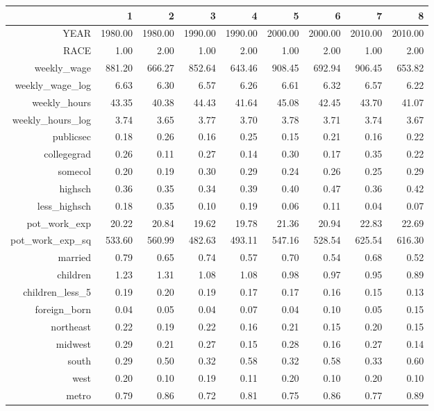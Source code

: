\begin{table}[ht]
\centering
\begin{tabular}{rrrrrrrrr}
  \hline
 & 1 & 2 & 3 & 4 & 5 & 6 & 7 & 8 \\ 
  \hline
YEAR & 1980.00 & 1980.00 & 1990.00 & 1990.00 & 2000.00 & 2000.00 & 2010.00 & 2010.00 \\ 
  RACE & 1.00 & 2.00 & 1.00 & 2.00 & 1.00 & 2.00 & 1.00 & 2.00 \\ 
  weekly\_wage & 881.20 & 666.27 & 852.64 & 643.46 & 908.45 & 692.94 & 906.45 & 653.82 \\ 
  weekly\_wage\_log & 6.63 & 6.30 & 6.57 & 6.26 & 6.61 & 6.32 & 6.57 & 6.22 \\ 
  weekly\_hours & 43.35 & 40.38 & 44.43 & 41.64 & 45.08 & 42.45 & 43.70 & 41.07 \\ 
  weekly\_hours\_log & 3.74 & 3.65 & 3.77 & 3.70 & 3.78 & 3.71 & 3.74 & 3.67 \\ 
  publicsec & 0.18 & 0.26 & 0.16 & 0.25 & 0.15 & 0.21 & 0.16 & 0.22 \\ 
  collegegrad & 0.26 & 0.11 & 0.27 & 0.14 & 0.30 & 0.17 & 0.35 & 0.22 \\ 
  somecol & 0.20 & 0.19 & 0.30 & 0.29 & 0.24 & 0.26 & 0.25 & 0.29 \\ 
  highsch & 0.36 & 0.35 & 0.34 & 0.39 & 0.40 & 0.47 & 0.36 & 0.42 \\ 
  less\_highsch & 0.18 & 0.35 & 0.10 & 0.19 & 0.06 & 0.11 & 0.04 & 0.07 \\ 
  pot\_work\_exp & 20.22 & 20.84 & 19.62 & 19.78 & 21.36 & 20.94 & 22.83 & 22.69 \\ 
  pot\_work\_exp\_sq & 533.60 & 560.99 & 482.63 & 493.11 & 547.16 & 528.54 & 625.54 & 616.30 \\ 
  married & 0.79 & 0.65 & 0.74 & 0.57 & 0.70 & 0.54 & 0.68 & 0.52 \\ 
  children & 1.23 & 1.31 & 1.08 & 1.08 & 0.98 & 0.97 & 0.95 & 0.89 \\ 
  children\_less\_5 & 0.19 & 0.20 & 0.19 & 0.17 & 0.17 & 0.16 & 0.15 & 0.13 \\ 
  foreign\_born & 0.04 & 0.05 & 0.04 & 0.07 & 0.04 & 0.10 & 0.05 & 0.15 \\ 
  northeast & 0.22 & 0.19 & 0.22 & 0.16 & 0.21 & 0.15 & 0.20 & 0.15 \\ 
  midwest & 0.29 & 0.21 & 0.27 & 0.15 & 0.28 & 0.16 & 0.27 & 0.14 \\ 
  south & 0.29 & 0.50 & 0.32 & 0.58 & 0.32 & 0.58 & 0.33 & 0.60 \\ 
  west & 0.20 & 0.10 & 0.19 & 0.11 & 0.20 & 0.10 & 0.20 & 0.10 \\ 
  metro & 0.79 & 0.86 & 0.72 & 0.81 & 0.75 & 0.86 & 0.77 & 0.89 \\ 
   \hline
\end{tabular}
\end{table}
